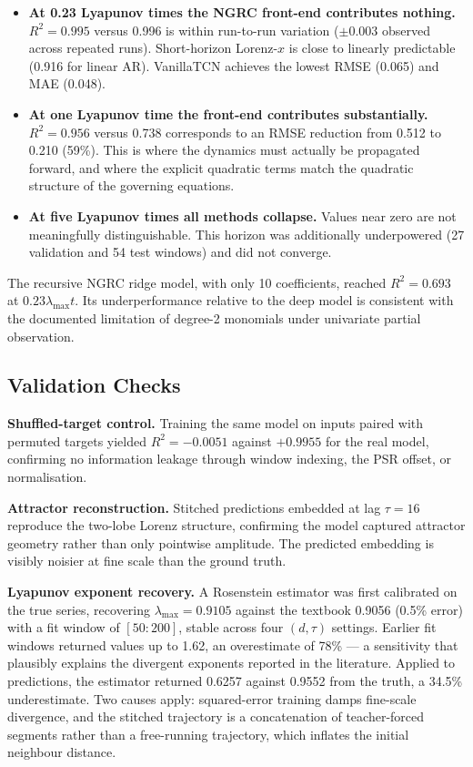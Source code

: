 \documentclass[11pt,a4paper]{article}
\begin{document}
\begin{itemize}[leftmargin=*]
  \item \textbf{At 0.23 Lyapunov times the NGRC front-end contributes nothing.}
    $R^2 = 0.995$ versus 0.996 is within run-to-run variation ($\pm 0.003$ observed across repeated runs).
    Short-horizon Lorenz-$x$ is close to linearly predictable (0.916 for linear AR).
    VanillaTCN achieves the lowest RMSE (0.065) and MAE (0.048).

  \item \textbf{At one Lyapunov time the front-end contributes substantially.}
    $R^2 = 0.956$ versus 0.738 corresponds to an RMSE reduction from 0.512 to 0.210 (59\%).
    This is where the dynamics must actually be propagated forward, and where the explicit quadratic terms match the quadratic structure of the governing equations.

  \item \textbf{At five Lyapunov times all methods collapse.}
    Values near zero are not meaningfully distinguishable.
    This horizon was additionally underpowered (27 validation and 54 test windows) and did not converge.
\end{itemize}

The recursive NGRC ridge model, with only 10 coefficients, reached $R^2 = 0.693$ at $0.23\lambda_{\max}t$.
Its underperformance relative to the deep model is consistent with the documented limitation of degree-2 monomials under univariate partial observation.


\subsection{Validation Checks}

\textbf{Shuffled-target control.}
Training the same model on inputs paired with permuted targets yielded $R^2 = -0.0051$ against $+0.9955$ for the real model, confirming no information leakage through window indexing, the PSR offset, or normalisation.

\textbf{Attractor reconstruction.}
Stitched predictions embedded at lag $\tau = 16$ reproduce the two-lobe Lorenz structure, confirming the model captured attractor geometry rather than only pointwise amplitude.
The predicted embedding is visibly noisier at fine scale than the ground truth.

\textbf{Lyapunov exponent recovery.}
A Rosenstein estimator was first calibrated on the true series, recovering $\lambda_{\max} = 0.9105$ against the textbook 0.9056 (0.5\% error) with a fit window of $[50{:}200]$, stable across four $(d, \tau)$ settings.
Earlier fit windows returned values up to 1.62, an overestimate of 78\% --- a sensitivity that plausibly explains the divergent exponents reported in the literature.
Applied to predictions, the estimator returned 0.6257 against 0.9552 from the truth, a 34.5\% underestimate.
Two causes apply: squared-error training damps fine-scale divergence, and the stitched trajectory is a concatenation of teacher-forced segments rather than a free-running trajectory, which inflates the initial neighbour distance.
\end{document}
